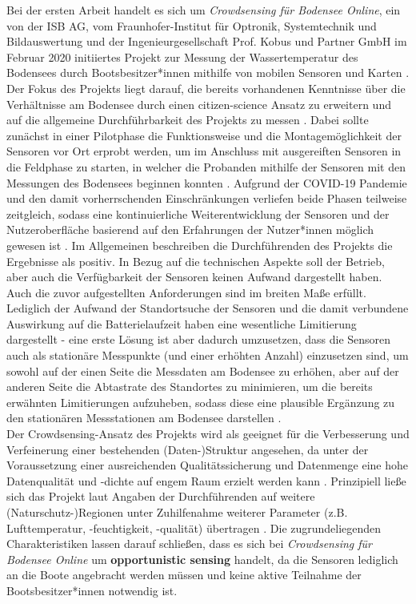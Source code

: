 Bei der ersten Arbeit handelt es sich um \textit{Crowdsensing für Bodensee Online}, ein von der ISB AG, vom Fraunhofer-Institut für Optronik, Systemtechnik und Bildauswertung und der Ingenieurgesellschaft Prof. Kobus und Partner GmbH im Februar 2020 initiiertes Projekt zur Messung der Wassertemperatur des Bodensees durch Bootsbesitzer*innen mithilfe von mobilen Sensoren und Karten \cite {Ministerium2021}. Der Fokus des Projekts liegt darauf, die bereits vorhandenen Kenntnisse über die Verhältnisse am Bodensee durch einen citizen-science Ansatz zu erweitern und auf die allgemeine Durchführbarkeit des Projekts zu messen \cite{Bodensee2021}. Dabei sollte zunächst in einer Pilotphase die Funktionsweise und die Montagemöglichkeit der Sensoren vor Ort erprobt werden, um im Anschluss mit ausgereiften Sensoren in die Feldphase zu starten, in welcher die Probanden mithilfe der Sensoren mit den Messungen des Bodensees beginnen konnten \cite{Bodensee2021}. Aufgrund der COVID-19 Pandemie und den damit vorherrschenden Einschränkungen verliefen beide Phasen teilweise zeitgleich, sodass eine kontinuierliche Weiterentwicklung der Sensoren und der Nutzeroberfläche basierend auf den Erfahrungen der Nutzer*innen möglich gewesen ist \cite{Bodensee2021}. Im Allgemeinen beschreiben die Durchführenden des Projekts die Ergebnisse als positiv. \newline In Bezug auf die technischen Aspekte soll der Betrieb, aber auch die Verfügbarkeit der Sensoren keinen Aufwand dargestellt haben. Auch die zuvor aufgestellten Anforderungen sind im breiten Maße erfüllt. Lediglich der Aufwand der Standortsuche der Sensoren und die damit verbundene Auswirkung auf die Batterielaufzeit haben eine wesentliche Limitierung dargestellt - eine erste Lösung ist aber dadurch umzusetzen, dass die Sensoren auch als stationäre Messpunkte (und einer erhöhten Anzahl) einzusetzen sind, um sowohl auf der einen Seite die Messdaten am Bodensee zu erhöhen, aber auf der anderen Seite die Abtastrate des Standortes zu minimieren, um die bereits erwähnten Limitierungen aufzuheben, sodass diese eine plausible Ergänzung zu den stationären Messstationen am Bodensee darstellen \cite{Bodensee2021}. \\ Der Crowdsensing-Ansatz des Projekts wird als geeignet für die Verbesserung und Verfeinerung einer bestehenden (Daten-)Struktur angesehen, da unter der Voraussetzung einer ausreichenden Qualitätssicherung und Datenmenge eine hohe Datenqualität und -dichte auf engem Raum erzielt werden kann \cite{Bodensee2021}. Prinzipiell ließe sich das Projekt laut Angaben der Durchführenden auf weitere (Naturschutz-)Regionen unter Zuhilfenahme weiterer Parameter (z.B. Lufttemperatur, -feuchtigkeit, -qualität) übertragen \cite{Bodensee2021}. Die zugrundeliegenden Charakteristiken lassen darauf schließen, dass es sich bei \textit{Crowdsensing für Bodensee Online} um \textbf{opportunistic sensing} handelt, da die Sensoren lediglich an die Boote angebracht werden müssen und keine aktive Teilnahme der Bootsbesitzer*innen notwendig ist.

